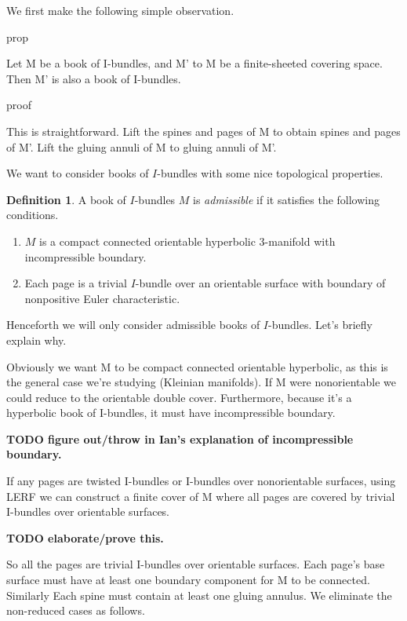 \documentclass[12pt]{amsart}
\theoremstyle{definition}
\newtheorem{defn}[theorem]{Definition}
\theoremstyle{remark}
\begin{document}
We first make the following simple observation.

prop

Let M be a book of I-bundles, and M' to M be a finite-sheeted covering space.
Then M' is also a book of I-bundles.

proof

This is straightforward. Lift the spines and pages of M to obtain spines and
pages of M'. Lift the gluing annuli of M to gluing annuli of M'.

We want to consider books of $I$-bundles with some nice topological properties.

\begin{defn}

A book of $I$-bundles $M$ is \emph{admissible} if it satisfies the following
conditions.

\begin{enumerate}

\item $M$ is a compact connected orientable hyperbolic 3-manifold with
incompressible boundary.

\item Each page is a trivial $I$-bundle over an orientable surface with
boundary of nonpositive Euler characteristic.

\end{enumerate}

\end{defn}

Henceforth we will only consider admissible books of $I$-bundles. Let's briefly
explain why.

Obviously we want M to be compact connected orientable hyperbolic, as this is
the general case we're studying (Kleinian manifolds). If M were nonorientable
we could reduce to the orientable double cover.  Furthermore, because it's
a hyperbolic book of I-bundles, it must have incompressible boundary.

\textbf{TODO figure out/throw in Ian's explanation of incompressible boundary.}

If any pages are twisted I-bundles or I-bundles over nonorientable surfaces,
using LERF we can construct a finite cover of M where all pages are covered by
trivial I-bundles over orientable surfaces.

\textbf{TODO elaborate/prove this.}

So all the pages are trivial I-bundles over orientable surfaces. Each page's
base surface must have at least one boundary component for M to be connected.
Similarly Each spine must contain at least one gluing annulus. We eliminate the
non-reduced cases as follows.
\end{document}
